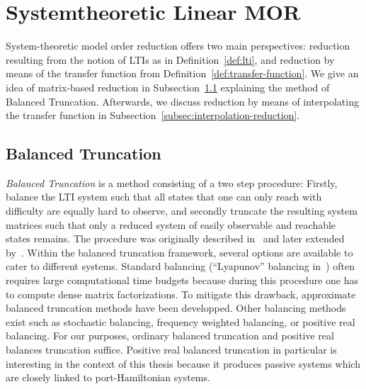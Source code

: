 \section{Systemtheoretic Linear MOR}\label{sec:system-mor}

System-theoretic model order reduction offers two main perspectives: reduction resulting from the notion of LTIs as in Definition~\ref{def:lti}, and reduction by means of the transfer function from Definition~\ref{def:transfer-function}.
We give an idea of matrix-based reduction in Subsection~\ref{subsec:balanced-truncation} explaining the method of Balanced Truncation.
Afterwards, we discuss reduction by means of interpolating the transfer function in Subsection~\ref{subsec:interpolation-reduction}.

\subsection{Balanced Truncation}\label{subsec:balanced-truncation}

\emph{Balanced Truncation} is a method consisting of a two step procedure: Firstly, balance the LTI system such that all states that one can only reach with difficulty are equally hard to observe, and secondly truncate the resulting system matrices such that only a reduced system of easily observable and reachable states remains.
The procedure was originally described in~\cite{Mullis1976} and later extended by~\cite{Moore1981}.
Within the balanced truncation framework, several options are available to cater to different systems.
Standard balancing (``Lyapunov'' balancing in~\cite{Gugercin2007}) often requires large computational time budgets because during this procedure one has to compute dense matrix factorizations.
To mitigate this drawback, approximate balanced truncation methods have been developped.
Other balancing methods exist such as stochastic balancing, frequency weighted balancing, or positive real balancing.
For our purposes, ordinary balanced truncation and positive real balances truncation suffice.
Positive real balanced truncation in particular is interesting in the context of this thesis because it produces passive systems which are closely linked to port-Hamiltonian systems.


